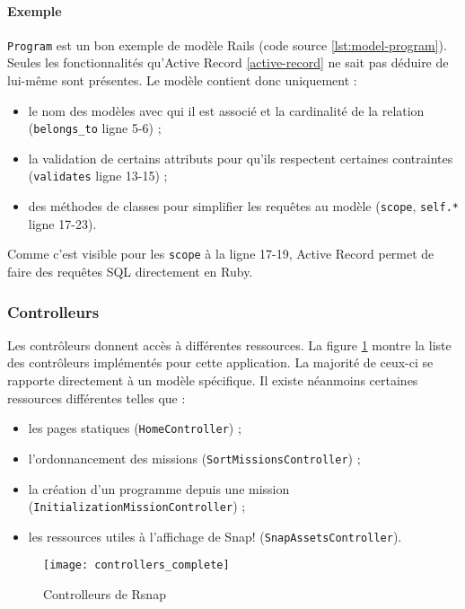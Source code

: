 \paragraph{Exemple} \texttt{Program} est un bon exemple de modèle Rails (code source \ref{lst:model-program}). Seules les fonctionnalités qu’Active Record \ref{active-record} ne sait pas déduire de lui-même sont présentes. Le modèle contient donc uniquement :
\begin{itemize}
  \item le nom des modèles avec qui il est associé et la cardinalité de la relation (\lstinline[language=Rails]{belongs_to} ligne 5-6) ;
  \item la validation de certains attributs pour qu'ils respectent certaines contraintes (\lstinline[language=Rails]{validates} ligne 13-15) ;
  \item des méthodes de classes pour simplifier les requêtes au modèle (\lstinline[language=Rails]{scope},  \lstinline[language=Rails]{self.*} ligne 17-23).
\end{itemize}

Comme c'est visible pour les \lstinline[language=Rails]{scope} à la ligne 17-19, Active Record permet de faire des requêtes SQL directement en Ruby. 


\subsubsection{Controlleurs}
Les contrôleurs donnent accès à différentes ressources. La figure \ref{fig:controllers} montre la liste des contrôleurs implémentés pour cette application. La majorité de ceux-ci se rapporte directement à un modèle spécifique. Il existe néanmoins certaines ressources différentes telles que : 
\begin{itemize}
  \item les pages statiques (\texttt{HomeController}) ;
  \item l'ordonnancement des missions (\texttt{SortMissionsController}) ; 
  \item la création d'un programme depuis une mission (\texttt{InitializationMissionController}) ;
  \item les ressources utiles à l'affichage de Snap! (\texttt{SnapAssetsController}).
\end{itemize}
\begin{figure}
 \begin{center}
   \texttt{[image: controllers\_complete]}
   \caption{Controlleurs de Rsnap}
   \label{fig:controllers}
 \end{center}
\end{figure}

